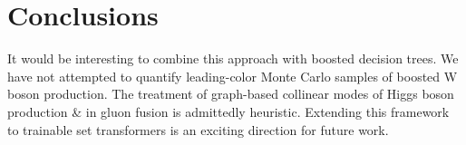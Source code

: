 \section{Conclusions}\label{sec:conclusions}

It would be interesting to combine this approach with boosted decision
trees. We have not attempted to quantify leading-color Monte Carlo
samples of boosted W boson production. The treatment of graph-based
collinear modes of Higgs boson production & in gluon fusion is admittedly
heuristic. Extending this framework to trainable set transformers is an
exciting direction for future work.

